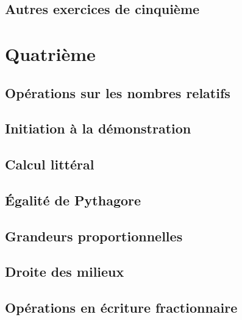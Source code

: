 \documentclass[a4paper,10pt]{book}
\begin{document}
\chapter{Autres exercices de cinquième}


\part{Quatrième}

\chapter{Opérations sur les nombres relatifs}


\chapter{Initiation à la démonstration}


\chapter{Calcul littéral}


\chapter{Égalité de Pythagore}


\chapter{Grandeurs proportionnelles}


\chapter{Droite des milieux}


\chapter{Opérations en écriture fractionnaire}

\end{document}
